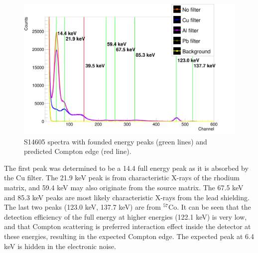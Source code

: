 \begin{figure}[H]
 \centering
 \includegraphics[scale=0.125, angle = 0]{./pictures/S14GammaTest.png}
 \caption{S14605 spectra with founded energy peaks (green lines) and predicted Compton edge (red line).}
 \label{S14605 spectra}
 
\end{figure}


\par
The first peak was determined to be a 14.4 full energy peak as it is absorbed by the Cu filter. The 21.9 keV peak is from characteristic X-rays of the rhodium matrix, and 59.4 keV may also originate from the source matrix. The 67.5 keV and 85.3 keV peaks are most likely characteristic X-rays from the lead shielding. The last two peaks (123.0 keV, 137.7 keV) are from $^{57}$Co. It can be seen that the detection efficiency of the full energy at higher energies (122.1 keV) is very low, and that Compton scattering is preferred interaction effect inside the detector at these energies, resulting in the expected Compton edge. The expected peak at 6.4 keV is hidden in the electronic noise.

